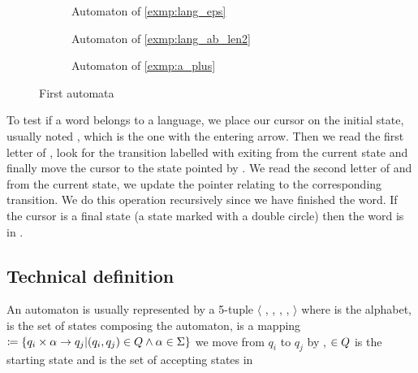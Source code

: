 \begin{figure}[H]
  \centering
  \begin{subfigure}[b]{0.45\textwidth}
    \centering
    \caption{Automaton of \cref{exmp:lang_eps}}
  \end{subfigure}
  \begin{subfigure}[b]{0.45\textwidth}
    \centering
    \caption{Automaton of \cref{exmp:lang_ab_len2}}
  \end{subfigure}
  \begin{subfigure}[b]{0.45\textwidth}
    \centering
    \caption{Automaton of \cref{exmp:a_plus}}
  \end{subfigure}
  \caption{First automata}
\end{figure}

To test if a word \word{} belongs to a language, we place our cursor on the initial state, usually noted \qzero{}, which is the one with the entering arrow. Then we read the first letter  of \word{}, look for the transition \transitioni{} labelled with  exiting from the current state and finally move the cursor to the state \qi{} pointed by \transitioni{}. We read the second letter of \word{} and from the current state, we update the pointer relating to the corresponding transition. We do this operation recursively since we have finished the word. If the cursor is a final state (a state marked with a double circle) then the word is in \lang{}.

\subsection{Technical definition}
An automaton \automaton{} is usually represented by a 5-tuple $\langle$ \alphabet{}, \states{}, \transition{}, \qzero{}, \qend{} $\rangle$ where \alphabet{} is the alphabet, \states{} is the set of states composing the automaton, \transition{} is a mapping \transition{} $\coloneqq \{q_i \times \alpha{} \rightarrow q_j | (q_i, q_j) \in Q{} \wedge \alpha{} \in \Sigma \} $ we move from $ q_i $ to $q_j$ by , \qzero{} $\in Q{}$ is the starting state and \qend{} is the set of accepting states in \states{}

